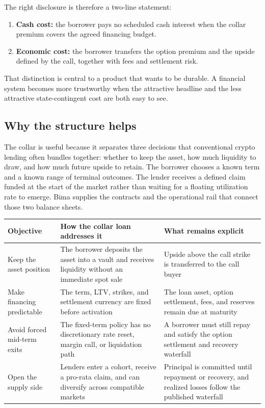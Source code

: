 \documentclass[11pt,oneside]{article}
\begin{document}
The right disclosure is therefore a two-line statement:

\begin{enumerate}
\item \textbf{Cash cost:} the borrower pays no scheduled cash interest when the collar premium covers the agreed financing budget.
\item \textbf{Economic cost:} the borrower transfers the option premium and the upside defined by the call, together with fees and settlement risk.
\end{enumerate}

That distinction is central to a product that wants to be durable. A financial system becomes more trustworthy when the attractive headline and the less attractive state-contingent cost are both easy to see.

\subsection{Why the structure helps}

The collar is useful because it separates three decisions that conventional
crypto lending often bundles together: whether to keep the asset, how much
liquidity to draw, and how much future upside to retain. The borrower chooses a
known term and a known range of terminal outcomes. The lender receives a
defined claim funded at the start of the market rather than waiting for a
floating utilization rate to emerge. Bima supplies the contracts and the
operational rail that connect those two balance sheets.

\begin{center}
\begin{tabularx}{\textwidth}{@{}p{}YY@{}}
\toprule
\textbf{Objective} & \textbf{How the collar loan addresses it} & \textbf{What remains explicit} \\
\midrule
Keep the asset position & The borrower deposits the asset into a vault and receives liquidity without an immediate spot sale & Upside above the call strike is transferred to the call buyer \\
Make financing predictable & The term, LTV, strikes, and settlement currency are fixed before activation & The loan asset, option settlement, fees, and reserves remain due at maturity \\
Avoid forced mid-term exits & The fixed-term policy has no discretionary rate reset, margin call, or liquidation path & A borrower must still repay and satisfy the option settlement and recovery waterfall \\
Open the supply side & Lenders enter a cohort, receive a pro-rata claim, and can diversify across compatible markets & Principal is committed until repayment or recovery, and realized losses follow the published waterfall \\
\bottomrule
\end{tabularx}
\end{center}
\end{document}
